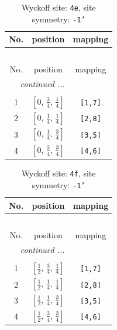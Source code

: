 \documentclass[fleqn,8pt]{jsarticle}
\begin{document}
\begin{longtable}{ccc}
\caption{Wyckoff site: {\tt 4e}, site symmetry: {\tt -1'}}
 \\
 \hline \hline
No. & position & mapping \\ \hline \endfirsthead

\multicolumn{2}{l}{\tablename\ \thetable{}} \\
 \hline \hline
No. & position & mapping \\ \hline \endhead

 \hline \hline
\multicolumn{2}{r}{\footnotesize\it continued ...} \\ \endfoot

 \hline \hline
\multicolumn{2}{r}{} \\ \endlastfoot

1 & $\left[ 0,\, \frac{3}{4},\, \frac{1}{4} \right]$ & {\tt [1,7]} \\ \hline
2 & $\left[ 0,\, \frac{1}{4},\, \frac{1}{4} \right]$ & {\tt [2,8]} \\ \hline
3 & $\left[ 0,\, \frac{1}{4},\, \frac{3}{4} \right]$ & {\tt [3,5]} \\ \hline
4 & $\left[ 0,\, \frac{3}{4},\, \frac{3}{4} \right]$ & {\tt [4,6]} \\
\end{longtable}
\renewcommand{\arraystretch}{1.2}
\begin{longtable}{ccc}
\caption{Wyckoff site: {\tt 4f}, site symmetry: {\tt -1'}}
 \\
 \hline \hline
No. & position & mapping \\ \hline \endfirsthead

\multicolumn{2}{l}{\tablename\ \thetable{}} \\
 \hline \hline
No. & position & mapping \\ \hline \endhead

 \hline \hline
\multicolumn{2}{r}{\footnotesize\it continued ...} \\ \endfoot

 \hline \hline
\multicolumn{2}{r}{} \\ \endlastfoot

1 & $\left[ \frac{1}{2},\, \frac{3}{4},\, \frac{1}{4} \right]$ & {\tt [1,7]} \\ \hline
2 & $\left[ \frac{1}{2},\, \frac{1}{4},\, \frac{1}{4} \right]$ & {\tt [2,8]} \\ \hline
3 & $\left[ \frac{1}{2},\, \frac{1}{4},\, \frac{3}{4} \right]$ & {\tt [3,5]} \\ \hline
4 & $\left[ \frac{1}{2},\, \frac{3}{4},\, \frac{3}{4} \right]$ & {\tt [4,6]} \\
\end{longtable}
\end{document}
